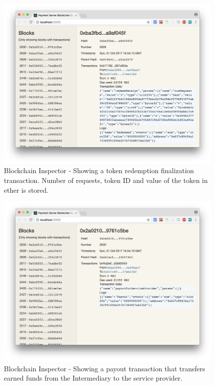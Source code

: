 \documentclass[a4paper,12pt]{scrartcl}
\begin{document}
\begin{figure}[H]
\centering
\includegraphics[width=450pt]{Images/Visualizer-FinalizeRedemption.png}
\caption{Blockchain Inspector - Showing a token redemption finalization transaction. Number of requests, token ID and value of the token in ether is stored.}
\label{fig:BlockchainInspector2}
\end{figure}

\begin{figure}[H]
\centering
\includegraphics[width=450pt]{Images/Visualizer-Payout.png}
\caption{Blockchain Inspector - Showing a payout transaction that transfers earned funds from the Intermediary to the service provider.}
\label{fig:BlockchainInspector3}
\end{figure}
\end{document}
